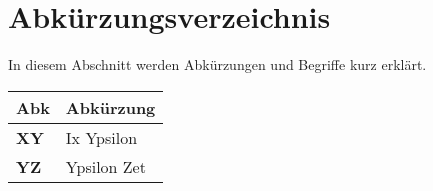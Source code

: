 %
%

\thispagestyle{empty}

\chapter*{Abkürzungsverzeichnis}\label{chap.glossar}

In diesem Abschnitt werden Abkürzungen und Begriffe kurz erklärt.

\begin{longtable}{|m{3cm}|m{11cm}|}\hline	
	\rowcolor{gray} \textbf{Abk}&
	Abkürzung \\ \hline	

	\textbf{XY}&
	Ix Ypsilon \\ \hline	
	
	\textbf{YZ}&
	Ypsilon Zet \\ \hline
	
\end{longtable}
